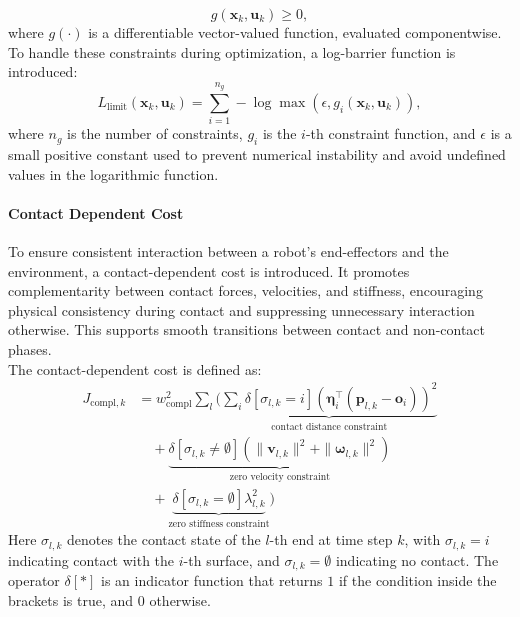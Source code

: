 \documentclass[main.tex]{subfiles}
\begin{document}
\begin{sloppypar}
\begin{equation}
g(\mathbf{x}_k, \mathbf{u}_k) \geq 0,
\end{equation}
where $g(\cdot)$ is a differentiable vector-valued function, evaluated componentwise. To handle these constraints during optimization, a log-barrier function is introduced:
\begin{equation}
L_{\text{limit}}(\mathbf{x}_k, \mathbf{u}_k) = \sum_{i=1}^{n_g} -\log \max(\epsilon, g_i(\mathbf{x}_k, \mathbf{u}_k)),
\end{equation}
where $n_g$ is the number of constraints, $g_i$ is the $i$-th constraint function, and $\epsilon$ is a small positive constant used to prevent numerical instability and avoid undefined values in the logarithmic function.
\paragraph{Contact Dependent Cost} 
To ensure consistent interaction between a robot’s end-effectors and the environment, a contact-dependent cost is introduced. It promotes complementarity between contact forces, velocities, and stiffness, encouraging physical consistency during contact and suppressing unnecessary interaction otherwise. This supports smooth transitions between contact and non-contact phases.\\
\newpage
The contact-dependent cost is defined as:
\begin{equation}
\label{eq:compl_cost}
\begin{aligned}
    J_{\text{compl},k} 
    &= w_{\text{compl}}^2 \sum_l \Bigg(
    \underbrace{ \sum_i \delta\left[\sigma_{l,k} = i\right] \left( \boldsymbol{\eta}_i^\top (\mathbf{p}_{l,k} - \mathbf{o}_i) \right)^2 }_{\text{contact distance constraint}} \\
    &\quad + \underbrace{ \delta\left[\sigma_{l,k} \neq \emptyset\right] \left( \| \mathbf{v}_{l,k} \|^2 + \| \boldsymbol{\omega}_{l,k} \|^2 \right) }_{\text{zero velocity constraint}} \\
    &\quad + \underbrace{ \delta\left[\sigma_{l,k} = \emptyset\right] \lambda_{l,k}^2 }_{\text{zero stiffness constraint}}
    \Bigg)
\end{aligned}
\end{equation}
Here $\sigma_{l,k}$ denotes the contact state of the $l$-th end at time step $k$, with $\sigma_{l,k} = i$ indicating contact with the $i$-th surface, and $\sigma_{l,k} = \emptyset$ indicating no contact. The operator $\delta[\ast]$ is an indicator function that returns $1$ if the condition inside the brackets is true, and $0$ otherwise.\\

\end{sloppypar}
\end{document}
